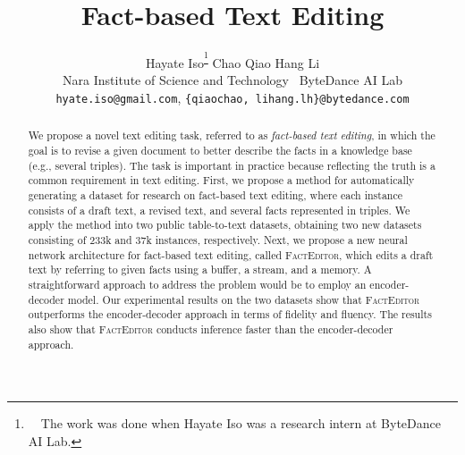 \documentclass[11pt,a4paper]{article}
\title{Fact-based Text Editing}
\author{
    Hayate Iso\textsuperscript{\dag\thanks{~~The work was done when Hayate Iso was a research intern at ByteDance AI Lab.}} \quad Chao Qiao\textsuperscript{\ddag} \quad Hang Li\textsuperscript{\ddag}\\
    \textsuperscript{\dag}Nara Institute of Science and Technology~
    \textsuperscript{\ddag}ByteDance AI Lab\\
    \texttt{hyate.iso@gmail.com}, 
    \texttt{\{qiaochao, lihang.lh\}@bytedance.com}
}
\date{}
\begin{document}
\maketitle
\begin{abstract}
We propose a novel text editing task, referred to as \textit{fact-based text editing}, in which the goal is to revise a given document to better describe the facts in a knowledge base (e.g., several triples). The task is important in practice because reflecting the truth is a common requirement in text editing. First, we propose a method for automatically generating a dataset for research on fact-based text editing, where each instance consists of a draft text, a revised text, and several facts represented in triples. We apply the method into two public table-to-text datasets, obtaining two new datasets consisting of 233k and 37k instances, respectively. Next, we propose a new neural network architecture for fact-based text editing, called \textsc{FactEditor}, which edits a draft text by referring to given facts using a buffer, a stream, and a memory. A straightforward approach to address the problem would be to employ an encoder-decoder model. Our experimental results on the two datasets show that \textsc{FactEditor} outperforms the encoder-decoder approach in terms of fidelity and fluency. The results also show that \textsc{FactEditor} conducts inference faster than the encoder-decoder approach. 
\end{abstract}
\end{document}
